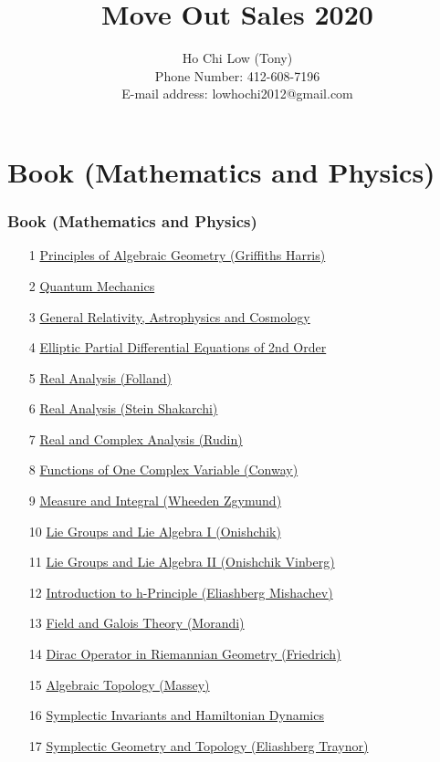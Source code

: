 \documentclass[t]{beamer}
\title{Move Out Sales 2020}
\date{}
\author{Ho Chi Low (Tony) \\ Phone Number: 412-608-7196 \\ E-mail address: lowhochi2012@gmail.com}
\newcommand{\hlink}[2]{\hyperlink{#1}{#2}}
\begin{document}
\frame{\titlepage}
\section{Book (Mathematics and Physics)}

\begin{frame}[allowframebreaks]
\frametitle{Book (Mathematics and Physics)}
\begin{enumerate}
\item[1] \hlink{AG}{Principles of Algebraic Geometry (Griffiths Harris)}
\item[2] \hlink{QM}{Quantum Mechanics}
\item[3] \hlink{GAC}{General Relativity, Astrophysics and Cosmology}
\item[4] \hlink{ePDE}{Elliptic Partial Differential Equations of 2nd Order}
\item[5] \hlink{RAF}{Real Analysis (Folland)}
\item[6] \hlink{RASS}{Real Analysis (Stein Shakarchi)}
\item[7] \hlink{RCA}{Real and Complex Analysis (Rudin)}
\item[8] \hlink{CVC}{Functions of One Complex Variable (Conway)}
\item[9] \hlink{MWZ}{Measure and Integral (Wheeden Zgymund)}
\item[10] \hlink{LGA1}{Lie Groups and Lie Algebra I (Onishchik)}
\item[11] \hlink{LGA2}{Lie Groups and Lie Algebra II (Onishchik Vinberg)}
\item[12] \hlink{hPE}{Introduction to h-Principle (Eliashberg Mishachev)}
\item[13] \hlink{GT}{Field and Galois Theory (Morandi)}
\item[14] \hlink{DF}{Dirac Operator in Riemannian Geometry (Friedrich)}
\item[15] \hlink{ATM}{Algebraic Topology (Massey)}
\item[16] \hlink{SHZ}{Symplectic Invariants and Hamiltonian Dynamics}
\item[17] \hlink{SET}{Symplectic Geometry and Topology (Eliashberg Traynor)}
\end{enumerate}
\end{frame}
\end{document}
